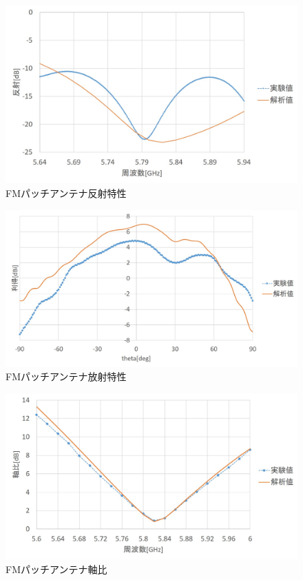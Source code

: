 \begin{figure}[H]
	\centering
	\includegraphics[scale=0.5]{04/fig/4-7-5.jpg}
	\caption{FMパッチアンテナ反射特性}
	\label{fig4-7-5}
\end{figure}
\begin{figure}[H]
	\centering
	\includegraphics[scale=0.5]{04/fig/4-7-6.jpg}
	\caption{FMパッチアンテナ放射特性}
	\label{fig4-7-6}
\end{figure}
\begin{figure}[H]
	\centering
	\includegraphics[scale=0.5]{04/fig/4-7-7.jpg}
	\caption{FMパッチアンテナ軸比}
	\label{fig4-7-7}
\end{figure}

